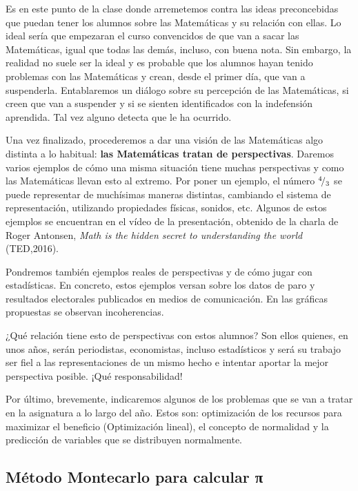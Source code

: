 Es en este punto de la clase donde arremetemos contra las ideas preconcebidas que puedan tener los alumnos sobre las Matemáticas y su relación con ellas. 
%
Lo ideal sería que empezaran el curso convencidos de que van a sacar las Matemáticas, igual que todas las demás, incluso, con buena nota.
%
Sin embargo, la realidad no suele ser la ideal y es probable que los alumnos hayan tenido problemas con las Matemáticas y crean, desde el primer día, que van a suspenderla.
%
Entablaremos un diálogo sobre su percepción de las Matemáticas, si creen que van a suspender y si se sienten identificados con la indefensión aprendida. Tal vez alguno detecta que le ha ocurrido.

Una vez finalizado, procederemos a dar una visión de las Matemáticas algo distinta a lo habitual: \textbf{las Matemáticas tratan de perspectivas}. 
%
Daremos varios ejemplos de cómo una misma situación tiene muchas perspectivas y como las Matemáticas llevan esto al extremo. 
%
Por poner un ejemplo, el número ${}^{4}\!/_{3}$ se puede representar de muchísimas maneras distintas, cambiando el sistema de representación, utilizando propiedades físicas, sonidos, etc. 
%
Algunos de estos ejemplos se encuentran en el vídeo de la presentación, obtenido de la charla de Roger Antonsen, \textit{Math is the hidden secret to understanding the world } (TED,2016).

Pondremos también ejemplos reales de perspectivas y de cómo jugar con estadísticas. 
%
En concreto, estos ejemplos versan sobre los datos de paro y resultados electorales publicados en medios de comunicación.
%
En las gráficas propuestas se observan incoherencias.


¿Qué relación tiene esto de perspectivas con estos alumnos? Son ellos quienes, en unos años, serán periodistas, economistas, incluso estadísticos y será su trabajo ser fiel a las representaciones de un mismo hecho e intentar aportar la mejor perspectiva posible. ¡Qué responsabilidad!

Por último, brevemente, indicaremos algunos de los problemas que se van a tratar en la asignatura a lo largo del año.
%
Estos son: optimización de los recursos para maximizar el beneficio (Optimización lineal), el concepto de normalidad y la predicción de variables que se distribuyen normalmente.

\subsection{Método Montecarlo para calcular π}
\label{pimanual}

